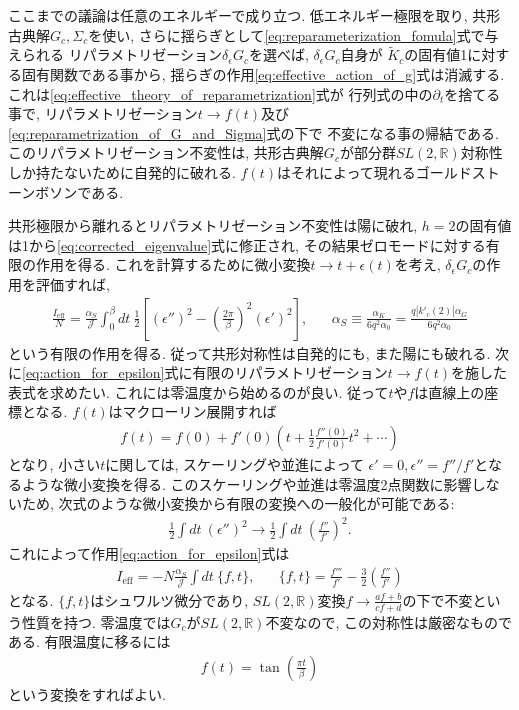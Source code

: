 ここまでの議論は任意のエネルギーで成り立つ. 
低エネルギー極限を取り, 共形古典解$G_c,\Sigma_c$を使い, 
さらに揺らぎとして\eqref{eq:reparameterization_fomula}式で与えられる
リパラメトリゼーション$\delta_{\epsilon}G_c$を選べば, $\delta_{\epsilon}G_c$自身が
$\tilde{K}_c$の固有値1に対する固有関数である事から, 
揺らぎの作用\eqref{eq:effective_action_of_g}式は消滅する. 
これは\eqref{eq:effective_theory_of_reparametrization}式が
行列式の中の$\partial_t$を捨てる事で, 
リパラメトリゼーション$t\to f(t)$及び\eqref{eq:reparametrization_of_G_and_Sigma}式の下で
不変になる事の帰結である. 
このリパラメトリゼーション不変性は, 共形古典解$G_c$が部分群$SL(2,\mathbb{R})$対称性
しか持たないために自発的に破れる. 
$f(t)$はそれによって現れるゴールドストーンボソンである. 

共形極限から離れるとリパラメトリゼーション不変性は陽に破れ, 
$h=2$の固有値は1から\eqref{eq:corrected_eigenvalue}式に修正され, 
その結果ゼロモードに対する有限の作用を得る. 
これを計算するために微小変換$t\to t + \epsilon(t)$を考え, $\delta_{\epsilon}G_c$の作用を評価すれば, 
\begin{align}
	\frac{I_{\mathrm{eff}}}{N} = \frac{\alpha_S}{\mathcal{J}}\int_0^{\beta}dt\ \frac{1}{2}
		\left[
			\left(\epsilon''\right)^2 - \left(\frac{2\pi}{\beta}\right)^2(\epsilon')^2
		\right],\hspace{20pt}
	\alpha_S \equiv \frac{\alpha_K}{6q^2\alpha_0} = \frac{q|k'_c(2)|\alpha_G}{6q^2\alpha_0}
	\label{eq:action_for_epsilon}
\end{align}
という有限の作用を得る. 
従って共形対称性は自発的にも, また陽にも破れる. 
次に\eqref{eq:action_for_epsilon}式に有限のリパラメトリゼーション$t\to f(t)$を施した表式を求めたい. 
これには零温度から始めるのが良い. 
従って$t$や$f$は直線上の座標となる. 
$f(t)$はマクローリン展開すれば
\begin{align}
	f(t) = f(0) + f'(0)\left(t
		+ \frac{1}{2}\frac{f''(0)}{f'(0)}t^2 + \cdots
	\right)
\end{align}
となり, 小さい$t$に関しては, スケーリングや並進によって
$\epsilon' = 0, \epsilon'' = f''/f'$となるような微小変換を得る. 
このスケーリングや並進は零温度2点関数に影響しないため, 
次式のような微小変換から有限の変換への一般化が可能である:
\begin{align}
	\frac{1}{2}\int dt\ (\epsilon'')^2 \to 
	\frac{1}{2}\int dt\ \left(\frac{f''}{f'}\right)^2.
\end{align}
これによって作用\eqref{eq:action_for_epsilon}式は
\begin{align}
	I_{\mathrm{eff}} = -N\frac{\alpha_S}{\mathcal{J}}\int dt\ \{f, t\},\hspace{20pt}
	\{f, t\} = \frac{f'''}{f'} - \frac{3}{2}\left(\frac{f''}{f'}\right)
	\label{eq:Schwartzian_action}
\end{align}
となる. $\{f,t\}$はシュワルツ微分であり, 
$SL(2, \mathbb{R})$変換$f \to \frac{af + b}{cf + d}$の下で不変という性質を持つ. 
零温度では$G_c$が$SL(2, \mathbb{R})$不変なので, この対称性は厳密なものである. 
有限温度に移るには
\begin{align}
	f(t) = \tan\left(\frac{\pi t}{\beta}\right)
\end{align}
という変換をすればよい. 

\pagebreak